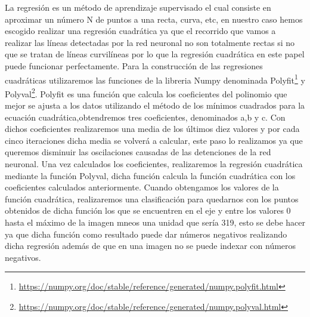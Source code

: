 La regresión es un método de aprendizaje supervisado el cual consiste en aproximar un número N de puntos a una recta, curva, etc, en nuestro caso hemos escogido realizar una regresión cuadrática ya que el recorrido
que vamos a realizar las líneas detectadas por la red neuronal no son totalmente rectas si no que se tratan de líneas curvilíneas por lo que la regresión cuadrática en este papel puede 
funcionar perfectamente. 
Para la construcción de las regresiones cuadráticas utilizaremos las funciones de la libreria Numpy denominada Polyfit\footnote{\url{https://numpy.org/doc/stable/reference/generated/numpy.polyfit.html}}
y Polyval\footnote{\url{ https://numpy.org/doc/stable/reference/generated/numpy.polyval.html}}. 
Polyfit es una función que calcula los  coeficientes del polinomio que mejor se ajusta a los datos utilizando el método de los mínimos 
cuadrados para la ecuación cuadrática,obtendremos tres coeficientes, denominados a,b y c. \newline
\newline
Con dichos coeficientes realizaremos una media de los últimos diez valores y por cada cinco iteraciones dicha media se volverá a calcular, este paso lo realizamos ya que 
queremos disminuir las oscilaciones causadas de las detenciones de la red neuronal. Una vez calculados los coeficientes, realizaremos la regresión cuadrática mediante la función Polyval, dicha función calcula
la función cuadrática con los coeficientes calculados anteriormente. \newline 
Cuando obtengamos los valores de la función cuadrática, realizaremos una clasificación para quedarnos con los puntos obtenidos
de dicha función los que se encuentren en el eje y entre los valores 0 hasta el máximo de la imagen mneos una unidad que sería 319, esto se debe hacer ya que dicha función como resultado puede 
dar números negativos realizando dicha regresión además de que en una imagen no se puede indexar con números negativos. \newline



